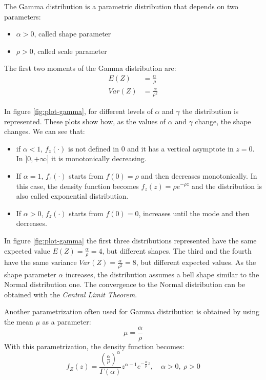 \documentclass[a4paper, twoside, openright, 12pt]{report}
\providecommand{\tightlist}{%
  \setlength{\itemsep}{0pt}\setlength{\parskip}{0pt}}
\theoremstyle{definition}
\theoremstyle{definition}
\theoremstyle{definition}
\theoremstyle{remark}
\begin{document}
The Gamma distribution is a parametric distribution that depends on two parameters:

\begin{itemize}
\tightlist
\item
  \(\alpha > 0\), called shape parameter
\item
  \(\rho > 0\), called scale parameter
\end{itemize}

The first two moments of the Gamma distribution are:
\begin{align*}
E(Z)   & = \frac{\alpha}{\rho} \\
Var(Z) & = \frac{\alpha}{\rho^2}
\end{align*}

In figure \ref{fig:plot-gamma}, for different levels of \(\alpha\) and \(\gamma\) the distribution is represented. These plots show how, as the values of \(\alpha\) and \(\gamma\) change, the shape changes. We can see that:

\begin{itemize}
\tightlist
\item
  if \(\alpha < 1\), \(f_z(\cdot)\) is not defined in \(0\) and it has a vertical asymptote in \(z = 0\). In \(]0, +\infty]\) it is monotonically decreasing.
\item
  If \(\alpha = 1\), \(f_z(\cdot)\) starts from \(f(0) = \rho\) and then decreases monotonically. In this case, the density function becomes \(f_z(z) = \rho e^{-\rho z}\) and the distribution is also called exponential distribution.
\item
  If \(\alpha > 0\), \(f_z(\cdot)\) starts from \(f(0) = 0\), increases until the mode and then decreases.
\end{itemize}

In figure \ref{fig:plot-gamma} the first three distributions represented have the same expected value \(E(Z)=\frac{\alpha}{\rho} = 4\), but different shapes. The third and the fourth have the same variance \(Var(Z) = \frac{\alpha}{\rho^2} = 8\), but different expected values. As the shape parameter \(\alpha\) increases, the distribution assumes a bell shape similar to the Normal distribution one. The convergence to the Normal distribution can be obtained with the \emph{Central Limit Theorem}.

Another parametrization often used for Gamma distribution is obtained by using the mean \(\mu\) as a parameter:
\[
\mu = \frac{\alpha}{\rho}
\]
With this parametrization, the density function becomes:
\[
f_Z(z) = \frac{\left(\frac{\alpha}{\mu}\right)^\alpha}{\Gamma(\alpha)}z^{\alpha-1}e^{-\frac{\alpha}{\mu} z}, \quad \alpha > 0, \ \rho > 0
\]
\end{document}
